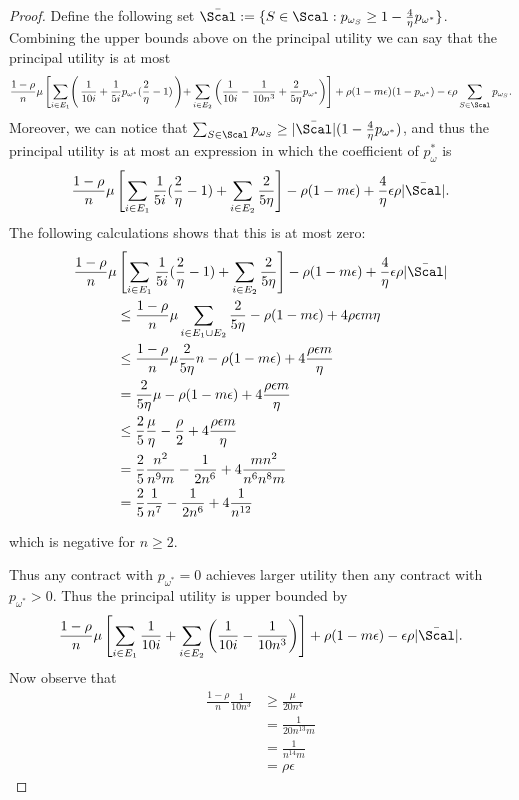 \begin{proof}
	Define the following set $\bar \Scal:=\{S\in\Scal: p_{\omega_S}\ge1-\frac{4}{\eta}p_{\omega^*}\}$. Combining the upper bounds above on the principal utility we can say that the principal utility is at most
	\[
	\frac{1-\rho}{n}\mu\left[\sum_{i\in E_1}\right(\frac{1}{10i}+\frac{1}{5i}p_{\omega^*}(\frac{2}{\eta}-1)\left)+\sum_{i\in E_2}\left(\frac{1}{10i}-\frac{1}{10n^3}+\frac{2}{5\eta}p_{\omega^*}\right)\right]+\rho(1-m\epsilon)(1-p_{\omega^*})-\epsilon\rho\sum_{S\in\Scal}p_{\omega_S}.
	\]
	Moreover, we can notice that $\sum_{S\in\Scal} p_{\omega_S}\ge |\bar\Scal|(1-\frac{4}{\eta}p_{\omega^*})$, and thus the principal utility is at most an expression in which the coefficient of $p_\omega^*$ is 
	\[
	\frac{1-\rho}{n}\mu\left[\sum_{i\in E_1}\frac{1}{5i}(\frac{2}{\eta}-1)+\sum_{i\in E_2}\frac{2}{5\eta}\right]-\rho(1-m\epsilon)+\frac{4}{\eta}\epsilon\rho|\bar\Scal|.
	\]
	The following calculations shows that this is at most zero:
	\begin{align}
			\frac{1-\rho}{n}\mu&\left[\sum_{i\in E_1}\frac{1}{5i}(\frac{2}{\eta}-1)+\sum_{i\in E_2}\frac{2}{5\eta}\right]-\rho(1-m\epsilon)+\frac{4}{\eta}\epsilon\rho|\bar\Scal|\\
			&\le \frac{1-\rho}{n}\mu\sum_{i\in E_1\cup E_2}\frac{2}{5\eta}-\rho(1-m\epsilon)+4{\rho \epsilon m}{\eta}\\
			&\le \frac{1-\rho}{n}\mu\frac{2}{5\eta}n-\rho(1-m\epsilon)+4\frac{\rho \epsilon m}{\eta}\\
			&=\frac{2}{5\eta}\mu-\rho(1-m\epsilon)+4\frac{\rho \epsilon m}{\eta}\\
			&\le \frac{2}{5}\frac{\mu}{\eta}-\frac{\rho}{2}+4\frac{\rho \epsilon m}{\eta}\\
			&=\frac{2}{5}\frac{n^2}{n^9m}-\frac{1}{2n^6}+4\frac{mn^2}{n^6n^8m}\\
			&=\frac{2}{5}\frac{1}{n^7}-\frac{1}{2n^6}+4\frac{1}{n^{12}}
	\end{align}
	
	which is negative for $n\ge 2$.
	
	Thus any contract with $p_{\omega^*}=0$ achieves larger utility then any contract with $p_{\omega^*}>0$. Thus the principal utility is upper bounded by
	\[
	\frac{1-\rho}{n}\mu\left[\sum_{i\in E_1}\frac{1}{10i}+\sum_{i\in E_2}\left(\frac{1}{10i}-\frac{1}{10n^3}\right)\right]+\rho(1-m\epsilon)-\epsilon\rho|\bar\Scal|.
	\]
	Now observe that 
	\begin{align}
		\frac{1-\rho}{n}\frac{1}{10n^3}&\ge \frac{\mu}{20n^4}\\
		&=\frac{1}{20n^13m}\\
		&=\frac{1}{n^14m}\tag{$n\ge O(1)$}\\
		&=\rho\epsilon
	\end{align}
	

\end{proof}
